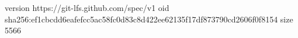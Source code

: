 version https://git-lfs.github.com/spec/v1
oid sha256:ef1cbcdd6eafefcc5ac58fc0d83c8d422ee62135f17df873790cd2606f0f8154
size 5566
